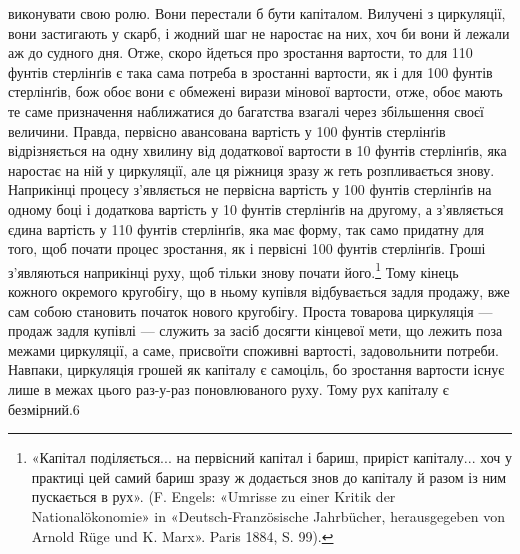 виконувати свою ролю. Вони перестали б бути капіталом. Вилучені
з циркуляції, вони застигають у скарб, і жодний шаг не наростає
на них, хоч би вони й лежали аж до судного дня. Отже,
скоро йдеться про зростання вартости, то для 110 фунтів стерлінґів
є така сама потреба в зростанні вартости, як і для 100 фунтів
стерлінґів, бож обоє вони є обмежені вирази мінової вартости,
отже, обоє мають те саме призначення наближатися до багатства
взагалі через збільшення своєї величини. Правда, первісно авансована
вартість у 100 фунтів стерлінґів відрізняється на одну хвилину
від додаткової вартости в 10 фунтів стерлінґів, яка наростає
на ній у циркуляції, але ця ріжниця зразу ж геть розпливається
знову. Наприкінці процесу з’являється не первісна вартість
у 100 фунтів стерлінґів на одному боці і додаткова вартість у
10 фунтів стерлінґів на другому, а з’являється єдина вартість у
110 фунтів стерлінґів, яка має форму, так само придатну для того,
щоб почати процес зростання, як і первісні 100 фунтів стерлінґів.
Гроші з’являються наприкінці руху, щоб тільки знову почати
його.\footnote{
«Капітал поділяється... на первісний капітал і бариш, приріст
капіталу... хоч у практиці цей самий бариш зразу ж додається знов до
капіталу й разом із ним пускається в рух». (F. Engels: «Umrisse zu
einer Kritik der Nationalökonomie» in «Deutsch-Französische Jahrbücher,
herausgegeben von Arnold Rüge und K. Marx». Paris 1884, S. 99).
} Тому кінець кожного окремого кругобігу, що в ньому
купівля відбувається задля продажу, вже сам собою становить
початок нового кругобігу. Проста товарова циркуляція — продаж
задля купівлі — служить за засіб досягти кінцевої мети,
що лежить поза межами циркуляції, а саме, присвоїти споживні
вартості, задовольнити потреби. Навпаки, циркуляція грошей
як капіталу є самоціль, бо зростання вартости існує лише в межах
цього раз-у-раз поновлюваного руху. Тому рух капіталу є
безмірний.6

